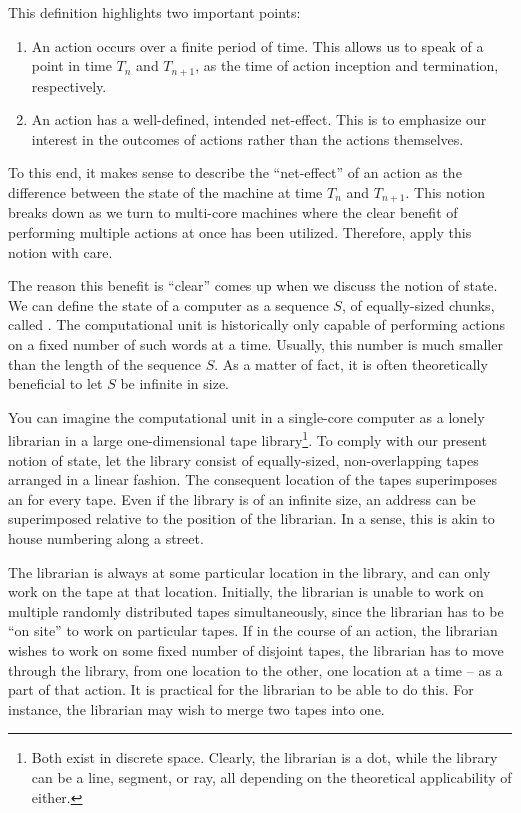 This definition highlights two important points:

\begin{enumerate}

\item An action occurs over a finite period of time. This allows us to speak of
a point in time $T_n$ and $T_{n+1}$, as the time of action inception and
termination, respectively.

\item An action has a well-defined, intended net-effect. This is to emphasize
our interest in the outcomes of actions rather than the actions themselves.

\end{enumerate}

To this end, it makes sense to describe the ``net-effect'' of an action as the
difference between the state of the machine at time $T_n$ and $T_{n+1}$. This
notion breaks down as we turn to multi-core machines where the clear benefit of
performing multiple actions at once has been utilized. Therefore, apply this
notion with care.

The reason this benefit is ``clear'' comes up when we discuss the notion of
state. We can define the state of a computer as a sequence $S$, of
equally-sized chunks, called . The computational unit is
historically only capable of performing actions on a fixed number of such words
at a time.  Usually, this number is much smaller than the length of the
sequence $S$. As a matter of fact, it is often theoretically beneficial to let
$S$ be infinite in size.

You can imagine the computational unit in a single-core computer as a lonely
librarian in a large one-dimensional tape library\footnote{Both exist in
discrete space. Clearly, the librarian is a dot, while the library can be a
line, segment, or ray, all depending on the theoretical applicability of
either.}. To comply with our present notion of state, let the library consist
of equally-sized, non-overlapping tapes arranged in a linear fashion. The
consequent location of the tapes superimposes an  for every tape.
Even if the library is of an infinite size, an address can be superimposed
relative to the position of the librarian. In a sense, this is akin to house
numbering along a street.

The librarian is always at some particular location in the library, and can
only work on the tape at that location. Initially, the librarian is unable to
work on multiple randomly distributed tapes simultaneously, since the librarian
has to be ``on site'' to work on particular tapes. If in the course of an
action, the librarian wishes to work on some fixed number of disjoint tapes,
the librarian has to move through the library, from one location to the other,
one location at a time -- as a part of that action. It is practical for the
librarian to be able to do this. For instance, the librarian may wish to merge
two tapes into one.

